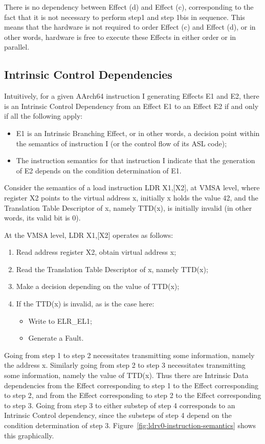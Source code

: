 \documentclass{book}
\begin{document}
There is no dependency between Effect (d) and Effect
(c), corresponding to the fact that it is not
necessary to perform step1 and step 1bis in sequence.
This means that the hardware is not required to order
Effect (c) and Effect (d), or in other words,
hardware is free to execute these Effects in either
order or in parallel. 

\subsection{Intrinsic Control Dependencies}

Intuitively, for a given AArch64 instruction I
generating Effects E1 and E2, there is an Intrinsic
Control Dependency from an Effect E1 to an Effect E2
if and only if all the following apply:
\begin{itemize}
\item E1 is an Intrinsic Branching Effect, or in
other words, a decision point within the semantics of
instruction I (or the control flow of its ASL code);
\item The instruction semantics for that instruction I
indicate that the generation of E2 depends on the
condition determination of E1. 
\end{itemize}

Consider the semantics of a load instruction LDR X1,[X2], at VMSA level, where
register X2 points to the virtual address x, initially x holds the value 42,
and the Translation Table Descriptor of x, namely TTD(x), is initially invalid
(in other words, its valid bit is 0). 

At the VMSA level, LDR X1,[X2] operates as follows: 
\begin{enumerate}
\item Read address register X2, obtain virtual address x; 
\item Read the Translation Table Descriptor of x, namely TTD(x); 
\item Make a decision depending on the value of TTD(x); 
\item If the TTD(x) is invalid, as is the case here: 
\begin{itemize}
\item Write to ELR\_EL1; 
\item Generate a Fault.
\end{itemize} 
\end{enumerate}
 
Going from step 1 to step 2 necessitates transmitting
some information, namely the address x. Similarly
going from step 2 to step 3 necessitates transmitting
some information, namely the value of TTD(x). Thus
there are Intrinsic Data dependencies from the Effect
corresponding to step 1 to the Effect corresponding
to step 2, and from the Effect corresponding to step
2 to the Effect corresponding to step 3.  
%
Going from step 3 to either substep of step 4
corresponds to an Intrinsic Control dependency, since
the substeps of step 4 depend on the condition
determination of step 3. 
%
Figure~\ref{fig:ldrv0-instruction-semantics} shows this graphically.
\end{document}
